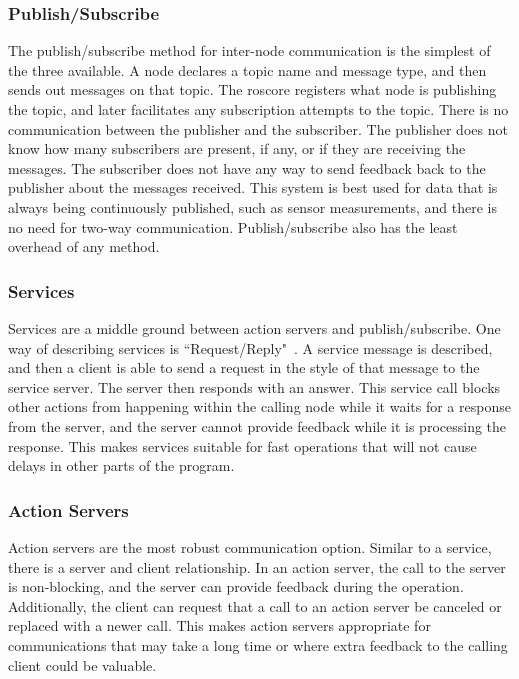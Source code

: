 \documentclass[thesis.tex]{subfile}
\begin{document}
\subsubsection{Publish/Subscribe}
The publish/subscribe method for inter-node communication is the simplest of the three available. A node declares a topic name and message type, and then sends out messages on that topic. The \gls{roscore} registers what node is publishing the topic, and later facilitates any subscription attempts to the topic. There is no communication between the publisher and the subscriber. The publisher does not know how many subscribers are present, if any, or if they are receiving the messages. The subscriber does not have any way to send feedback back to the publisher about the messages received. This system is best used for data that is always being continuously published, such as sensor measurements, and there is no need for two-way communication. Publish/subscribe also has the least overhead of any method.

\subsubsection{Services}
Services are a middle ground between action servers and publish/subscribe. One way of describing services is ``Request/Reply"~\cite{RosServices}. A service message is described, and then a client is able to send a request in the style of that message to the service server. The server then responds with an answer. This service call blocks other actions from happening within the calling node while it waits for a response from the server, and the server cannot provide feedback while it is processing the response. This makes services suitable for fast operations that will not cause delays in other parts of the program.

\subsubsection{Action Servers}
Action servers are the most robust communication option. Similar to a service, there is a server and client relationship. In an action server, the call to the server is non-blocking, and the server can provide feedback during the operation. Additionally, the client can request that a call to an action server be canceled or replaced with a newer call. This makes action servers appropriate for communications that may take a long time or where extra feedback to the calling client could be valuable.
\end{document}
